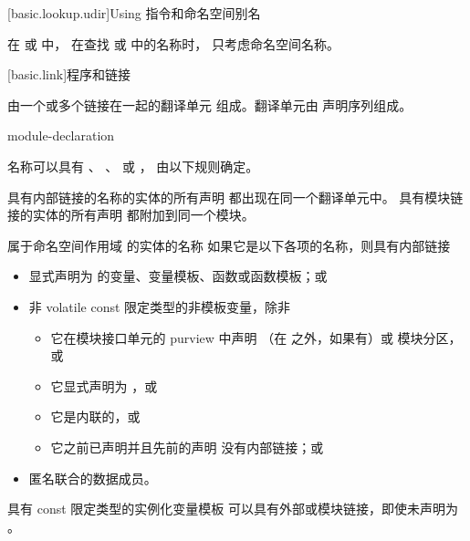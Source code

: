 [basic.lookup.udir]{Using 指令和命名空间别名}

\pnum
{}%
%
在  或  中，
在查找  或
 中的名称时，
只考虑命名空间名称。%
%

[basic.link]{程序和链接}%

\pnum
{}%
 由一个或多个链接在一起的翻译单元 组成。翻译单元由
声明序列组成。

\begin{bnf}
\br
    \br
     module-declaration  
\end{bnf}

\pnum
{}%
名称可以具有
、
、
 或
，
由以下规则确定。
\begin{note}
具有内部链接的名称的实体的所有声明
都出现在同一个翻译单元中。
具有模块链接的实体的所有声明
都附加到同一个模块。
\end{note}

\pnum
{}%
%
%
%
%
%
属于命名空间作用域 的实体的名称
如果它是以下各项的名称，则具有内部链接
\begin{itemize}
\item
  显式声明为  的变量、变量模板、函数或函数模板；或
\item
  非 volatile const 限定类型的非模板变量，除非
  \begin{itemize}
  \item 它在模块接口单元的 purview 中声明
    （在  之外，如果有）或
    模块分区，或
  \item 它显式声明为 ，或
  \item 它是内联的，或
  \item 它之前已声明并且先前的声明
  没有内部链接；或
  \end{itemize}
\item
  匿名联合的数据成员。
\end{itemize}
\begin{note}
具有 const 限定类型的实例化变量模板
可以具有外部或模块链接，即使未声明为 。
\end{note}

